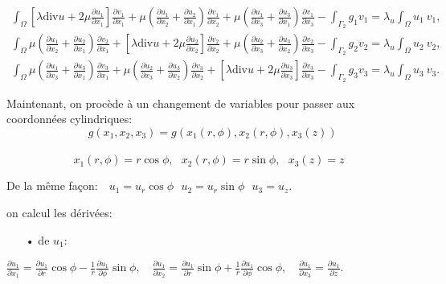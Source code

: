 \documentclass[a4paper,11pt]{article}   %
\begin{document}
\begin{eqnarray*}
\int_{\Omega} \left[\lambda \mbox{div}u + 2 \mu \frac{\partial u_1}{\partial x_1}\right] \frac{\partial v_1}{\partial x_1} + \mu \left(\frac{\partial u_1}{\partial x_2} + \frac{\partial u_2}{\partial x_1}\right)\frac{\partial v_1}{\partial x_2} + \mu \left(\frac{\partial u_1}{\partial x_3} + \frac{\partial u_3}{\partial x_1}\right)\frac{\partial v_1}{\partial x_3}
- \int_{\Gamma_2} g_1 v_1 =\lambda _u \int_{\Omega}u_1\ v_1,\nonumber\\
\int_{\Omega} \mu \left(\frac{\partial u_1}{\partial x_2} + \frac{\partial u_2}{\partial x_1}\right)\frac{\partial v_2}{\partial x_1} + \left[\lambda \mbox{div}u + 2 \mu \frac{\partial u_2}{\partial x_2}\right] \frac{\partial v_2}{\partial x_2} + \mu \left(\frac{\partial u_2}{\partial x_3} + \frac{\partial u_3}{\partial x_2}\right)\frac{\partial v_2}{\partial x_3}
- \int_{\Gamma_2} g_2 v_2 =\lambda _u \int_{\Omega}u_2\ v_2,\\
\int_{\Omega} \mu \left(\frac{\partial u_1}{\partial x_3} + \frac{\partial u_3}{\partial x_1}\right)\frac{\partial v_3}{\partial x_1} + \mu \left(\frac{\partial u_2}{\partial x_3} + \frac{\partial u_3}{\partial x_2}\right)\frac{\partial v_3}{\partial x_2}  + \left[\lambda \mbox{div}u + 2 \mu \frac{\partial u_3}{\partial x_3}\right] \frac{\partial v_3}{\partial x_3}
- \int_{\Gamma_2} g_3 v_3 =\lambda _u \int_{\Omega}u_3\ v_3.\nonumber
\end{eqnarray*}             

Maintenant, on procède à un changement de variables pour passer aux coordonnées cylindriques: \\
$$ \ \ \ g(x_1, x_2, x_3) = g(x_1(r, \phi), x_2(r, \phi), x_3(z))$$  \\
$$x_1(r, \phi) = r \cos \phi, \ \ \ x_2(r, \phi) = r \sin \phi, \ \ \ x_3(z) = z $$


De la même façon: $ \ \ \ 
u_1 = u_r \cos \phi \ \ \
u_2 = u_r \sin \phi \ \ \
u_3 = u_z. $

on calcul les dérivées:\\
\begin{itemize}
\item[•] de $u_1 :$
\end{itemize}


$ \frac{\partial u_1}{\partial x_1}=\frac{\partial u_1}{\partial r}\cos\phi - \frac{1}{r}\frac{\partial u_1} {\partial \phi}\sin\phi,\ \ \ $
 $ \frac{\partial u_1}{\partial x_2} = \frac{\partial u_1}{\partial r}\sin\phi + \frac{1}{r}\frac{\partial u_1}{\partial \phi}\cos\phi,  \ \ \ $
 $ \frac{\partial u_1}{\partial x_3} = \frac{\partial u_1}{\partial z}. $ \\
\end{document}
